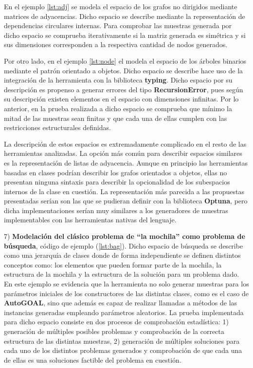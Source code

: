 En el ejemplo \ref{lst:adj} se modela el espacio de los grafos no dirigidos mediante matrices de adyacencias. Dicho espacio
se describe mediante la representación de dependencias circulares internas. Para comprobar las muestras
generada por dicho espacio se comprueba iterativamente si la matriz generada es simétrica y si sus dimensiones corresponden a
la respectiva cantidad de nodos generados. 

Por otro lado, en el ejemplo \ref{lst:node} el modela el espacio de los árboles binarios mediante el patrón orientado a objetos.
Dicho espacio se describe hace uso de la integración de la herramienta con la biblioteca {\bf typing}. 
Dicho espacio por su descripción es propenso a generar errores del tipo {\bf RecursionError},
pues según su descripción existen elementos en el espacio con dimensiones infinitas. Por lo anterior, en la prueba realizada a
dicho espacio se comprueba que mínimo la mitad de las muestras sean finitas y que cada una de ellas cumplen con las
restricciones estructurales definidas.

La descripción de estos espacios es extremadamente complicado en el resto de las herramientas analizadas. La opción más común
para describir espacios similares es la representación de listas de adyacencia. Aunque en principio las herramientas basadas
en clases podrían describir los grafos orientados a objetos, ellas no presentan ninguna sintaxis para describir la opcionalidad
de los subespacios internos de la clase en cuestión. La representación más parecida a las propuestas presentadas serían son las que se pudieran
definir con la biblioteca {\bf Optuna}, pero dicha implementaciones serían muy similares a los generadores de muestras implementables
con las herramientas nativas del lenguaje.

7) {\bf Modelación del clásico problema de ``la mochila'' como problema de búsqueda}, código de ejemplo (\ref{lst:bag}). Dicho espacio de búsqueda se describe como una
jerarquía de clases donde de forma independiente se definen distintos conceptos como: los elementos que pueden formar parte de
la mochila, la estructura de la mochila y la estructura de la solución para un problema dado. En este ejemplo se evidencia que la
herramienta no solo generar muestras para los parámetros iniciales de los constructores de las distintas clases, como es el caso de
      {\bf AutoGOAL}, sino que además es capaz de realizar llamadas a métodos de las instancias generadas empleando parámetros aleatorios. La
prueba implementada para dicho espacio consiste en dos procesos de comprobación estadística: 1) generación de múltiples posibles
problemas y comprobación de la correcta estructura de las distintas muestras, 2) generación de múltiples soluciones para cada uno
de los distintos problemas generados y comprobación de que cada una de ellas es una  soluciones factible del problema en cuestión.

